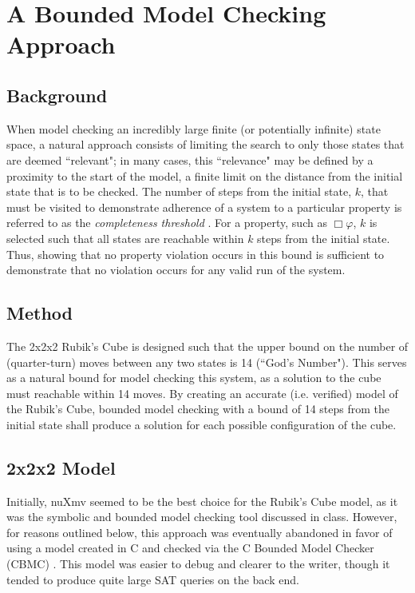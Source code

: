 \documentclass{article}
\renewcommand{\phi}{\varphi}
\newcommand{\always}{\Box}
\begin{document}
\newpage

\section{A Bounded Model Checking Approach}

\subsection{Background}
When model checking an incredibly large finite (or potentially infinite) state space, a natural approach consists of limiting the search to only those states that are deemed ``relevant"; in many cases, this ``relevance" may be defined by a proximity to the start of the model, a finite limit on the distance from the initial state that is to be checked. The number of steps from the initial state, $k$, that must be visited to demonstrate adherence of a system to a particular property is referred to as the \textit{completeness threshold} \cite{biere}. For a property, such as $\always \phi$, $k$ is selected such that all states are reachable within $k$ steps from the initial state. Thus, showing that no property violation occurs in this bound is sufficient to demonstrate that no violation occurs for any valid run of the system.

\subsection {Method}
The 2x2x2 Rubik's Cube is designed such that the upper bound on the number of (quarter-turn) moves between any two states is 14 (``God's Number"). This serves as a natural bound for model checking this system, as a solution to the cube must reachable within 14 moves. By creating an accurate (i.e. verified) model of the Rubik's Cube, bounded model checking with a bound of 14 steps from the initial state shall produce a solution for each possible configuration of the cube.

\subsection {2x2x2 Model}
Initially, nuXmv \cite{nuxmv} seemed to be the best choice for the Rubik's Cube model, as it was the symbolic and bounded model checking tool discussed in class. However, for reasons outlined below, this approach was eventually abandoned in favor of using a model created in C and checked via the C Bounded Model Checker (CBMC) \cite{cbmc}. This model was easier to debug and clearer to the writer, though it tended to produce quite large SAT queries on the back end.
\end{document}
